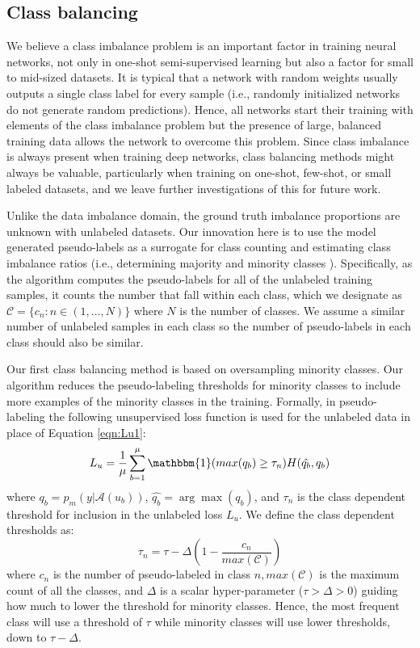 \documentclass[final]{cvpr}
\newcommand{\OSSSL}{one-shot semi-supervised learning }
\begin{document}
\subsection{Class balancing}
\label{sec:balancing}

We believe a class imbalance problem is an important factor in training neural networks, not only in \OSSSL but also a factor for small to mid-sized datasets.
It is typical that a network with random weights usually outputs a single class label for every sample (i.e., randomly initialized networks do not generate random predictions). 
Hence, all networks start their training with elements of the class imbalance problem but the presence of large, balanced training data allows the network to overcome this problem.
Since class imbalance is always present when training deep networks, class balancing methods might always be valuable,  particularly when training on one-shot, few-shot, or small labeled datasets, and we leave further investigations of this for future work.



Unlike the data imbalance domain, the ground truth imbalance proportions are unknown with unlabeled datasets.
Our innovation here is to use the model generated pseudo-labels as a surrogate for class counting and estimating class imbalance ratios (i.e., determining majority and minority classes ).
Specifically, as the algorithm computes the pseudo-labels for all of the unlabeled training samples, it counts the number that fall within each class, which we designate as $\mathcal{C} = \{ c_n : n \in (1, . . . , N) \}$ where $N$ is the number of classes.
We assume a similar number of unlabeled samples in each class so the number of pseudo-labels in each class should also be similar.


Our first class balancing method is based on oversampling minority classes.
Our algorithm reduces the pseudo-labeling thresholds for minority classes to include more examples of the minority classes in the training.
Formally, in pseudo-labeling the following unsupervised loss function is used for the unlabeled data in place of Equation \ref{eqn:Lu1}:
\begin{equation}
L_u = \frac{1}{\mu} \sum_{b=1}^{\mu} \mathbbm{1} (max( q_b ) \geq \tau_n ) H(\hat{q_b}, q_b)
\label{eqn:pseudo1}
\end{equation}
where $q_b = p_m(y|\mathcal{A}(u_b))$, $\hat{q_b} = \arg\max(q_b)$, and $\tau_n$ is the class dependent threshold for inclusion in the unlabeled loss $L_u$.
We define the class dependent thresholds as:
\begin{equation}
\tau_n = \tau - \Delta (1 - \frac{c_n}{max(\mathcal{C})})
\label{eqn:pseudo2}
\end{equation}
where $c_n$ is the number of pseudo-labeled in class $n, max(\mathcal{C})$ is the maximum count of all the classes, and $\Delta$ is a scalar hyper-parameter ($\tau  > \Delta > 0$) guiding how much to lower the threshold for minority classes.
Hence, the most frequent class will use a threshold of $\tau$ while minority classes will use lower thresholds, down to $ \tau - \Delta $.
\end{document}
